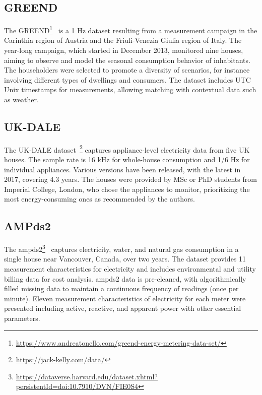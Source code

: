 \subsection{GREEND}

The GREEND\footnote{\url{https://www.andreatonello.com/greend-energy-metering-data-set/}}~\parencite{monacchiGREENDEnergyConsumption2014} is a 1 Hz dataset resulting from a measurement campaign in the Carinthia region of Austria and the Friuli-Venezia Giulia region of Italy. The year-long campaign, which started in December 2013, monitored nine houses, aiming to observe and model the seasonal consumption behavior of inhabitants. The householders were selected to promote a diversity of scenarios, for instance involving different types of dwellings and consumers. The dataset includes UTC Unix timestamps for measurements, allowing matching with contextual data such as weather.

\subsection{UK-DALE}

The UK-DALE dataset~\parencite{kellyUKDALEDatasetDomestic2015}\footnote{\url{https://jack-kelly.com/data/}} captures appliance-level electricity data from five UK houses. The sample rate is 16 kHz for whole-house consumption and 1/6 Hz for individual appliances. Various versions have been released, with the latest in 2017, covering 4.3 years. The houses were provided by MSc or PhD students from Imperial College, London, who chose the appliances to monitor, prioritizing the most energy-consuming ones as recommended by the authors.


\subsection{AMPds2}

The \acrlong{ampds2}\footnote{\url{https://dataverse.harvard.edu/dataset.xhtml?persistentId=doi:10.7910/DVN/FIE0S4}}~\parencite{makoninElectricityWaterNatural2016} captures electricity, water, and natural gas consumption in a single house near Vancouver, Canada, over two years. The dataset provides 11 measurement characteristics for electricity and includes environmental and utility billing data for cost analysis. \acrshort{ampds2} data is pre-cleaned, with algorithmically filled missing data to maintain a continuous frequency of readings (once per minute). Eleven measurement characteristics of electricity for each meter were presented including active, reactive, and apparent power with other essential parameters.

